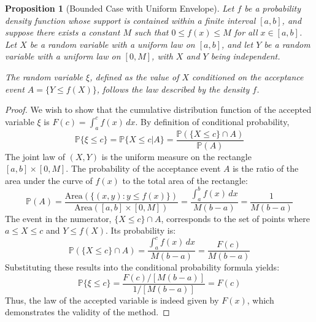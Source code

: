 \documentclass[12pt, openany]{book}
\theoremstyle{definition}
\theoremstyle{plain}
\newtheorem{proposition}[definition]{Proposition}
\theoremstyle{remark}
\newcommand{\probP}{\mathbb{P}}
\begin{document}
\begin{proposition}[Bounded Case with Uniform Envelope]
Let $f$ be a probability density function whose support is contained within a finite interval $[a,b]$, and suppose there exists a constant $M$ such that $0 \le f(x) \le M$ for all $x \in [a,b]$. Let $X$ be a random variable with a uniform law on $[a,b]$, and let $Y$ be a random variable with a uniform law on $[0,M]$, with $X$ and $Y$ being independent.

The random variable $\xi$, defined as the value of $X$ conditioned on the acceptance event $A = \{Y \le f(X)\}$, follows the law described by the density $f$.
\end{proposition}
\begin{proof}
We wish to show that the cumulative distribution function of the accepted variable $\xi$ is $F(c) = \int_a^c f(x)\,dx$. By definition of conditional probability,
$$ \probP\{\xi \le c\} = \probP\{X \le c | A\} = \frac{\probP(\{X \le c\} \cap A)}{\probP(A)} $$
The joint law of $(X,Y)$ is the uniform measure on the rectangle $[a,b] \times [0,M]$. The probability of the acceptance event $A$ is the ratio of the area under the curve of $f(x)$ to the total area of the rectangle:
$$ \probP(A) = \frac{\text{Area}(\{(x,y) : y \le f(x)\})}{\text{Area}([a,b]\times[0,M])} = \frac{\int_a^b f(x)\,dx}{M(b-a)} = \frac{1}{M(b-a)} $$
The event in the numerator, $\{X \le c\} \cap A$, corresponds to the set of points where $a \le X \le c$ and $Y \le f(X)$. Its probability is:
$$ \probP(\{X \le c\} \cap A) = \frac{\int_a^c f(x)\,dx}{M(b-a)} = \frac{F(c)}{M(b-a)} $$
Substituting these results into the conditional probability formula yields:
$$ \probP\{\xi \le c\} = \frac{F(c) / [M(b-a)]}{1 / [M(b-a)]} = F(c) $$
Thus, the law of the accepted variable is indeed given by $F(x)$, which demonstrates the validity of the method.
\end{proof}
\end{document}
